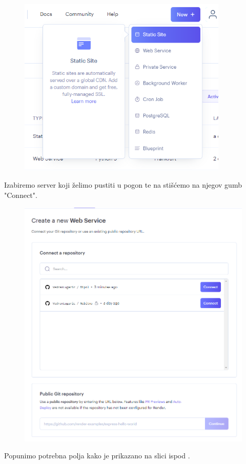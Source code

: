 				\begin{figure}[htb]
					\centering
					\includegraphics[width=10cm]{slike/front_2.png}
					\label{fig:fer-logo}
				\end{figure}
				\newpage
			
				\text{}Izabiremo server koji želimo pustiti u pogon te na stišćemo na njegov gumb "Connect".
				
				\begin{figure}[htb]
					\centering
					\includegraphics[width=15cm]{slike/back_4.png}
					\label{fig:fer-logo}
				\end{figure}
				\newpage
				\text{}Popunimo potrebna polja kako je prikazano na slici ispod .
				
